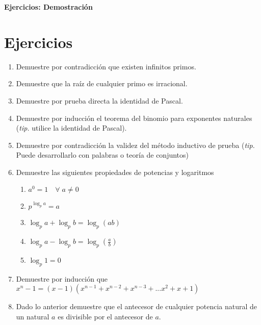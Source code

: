 \documentclass[spanish,12pt]{article}
\begin{document}
	\begin{titlepage}
	\begin{center}
	\hspace{0pt}
	\vfill
	{\Large\textbf{{Ejercicios: Demostración}}}
	
	\thispagestyle{empty}
	\vfill
	\end{center}
	\end{titlepage}
\newpage
\section{Ejercicios}
\begin{enumerate}[1)]
    \item Demuestre por contradicción que existen infinitos primos.
    \item Demuestre que la raíz de cualquier primo es irracional.
    \item Demuestre por prueba directa la identidad de Pascal.
    \item Demuestre por inducción el teorema del binomio para exponentes naturales (\textit{tip.} utilice la identidad de Pascal).
    \item Demuestre por contradicción la validez del método inductivo de prueba (\textit{tip.} Puede desarrollarlo con palabras o teoría de conjuntos)
    \item Demuestre las siguientes propiedades de potencias y logaritmos
    \begin{enumerate}
        \item $a^0=1\quad\forall\;a\neq0$
        \item $p^{\log_pa}=a$
        \item $\log_{p}a+\log_{p}b=\log_{p}(ab)$
        \item $\log_{p}a-\log_{p}b=\log_{p}(\frac{a}{b})$
        \item $\log_p1=0$
    \end{enumerate}
    \item Demuestre por inducción que $x^n-1=(x-1)(x^{n-1}+x^{n-2}+x^{n-3}+...x^2+x+1)$
    \item Dado lo anterior demuestre que el antecesor de cualquier potencia natural de un natural $a$ es divisible por el antecesor de $a$.
    
\end{enumerate}
\end{document}
